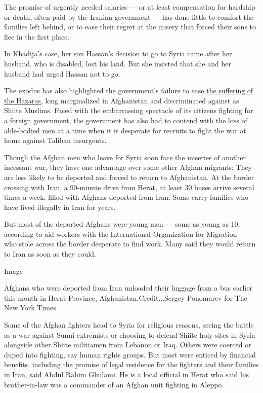 The promise of urgently needed salaries --- or at least compensation for
hardship or death, often paid by the Iranian government --- has done
little to comfort the families left behind, or to ease their regret at
the misery that forced their sons to flee in the first place.

In Khadija's case, her son Hassan's decision to go to Syria came after
her husband, who is disabled, lost his land. But she insisted that she
and her husband had urged Hassan not to go.

The exodus has also highlighted the government's failure to ease
\href{https://www.nytimes3xbfgragh.onion/2016/07/25/world/asia/hazara-afghanistan-victims.html}{the
suffering of the Hazaras}, long marginalized in Afghanistan and
discriminated against as Shiite Muslims. Faced with the embarrassing
spectacle of its citizens fighting for a foreign government, the
government has also had to contend with the loss of able-bodied men at a
time when it is desperate for recruits to fight the war at home against
Taliban insurgents.

Though the Afghan men who leave for Syria soon face the miseries of
another incessant war, they have one advantage over some other Afghan
migrants: They are less likely to be deported and forced to return to
Afghanistan. At the border crossing with Iran, a 90-minute drive from
Herat, at least 30 buses arrive several times a week, filled with
Afghans deported from Iran. Some carry families who have lived illegally
in Iran for years.

But most of the deported Afghans were young men --- some as young as 10,
according to aid workers with the International Organization for
Migration --- who stole across the border desperate to find work. Many
said they would return to Iran as soon as they could.

Image

Afghans who were deported from Iran unloaded their luggage from a bus
earlier this month in Herat Province, Afghanistan.Credit...Sergey
Ponomarev for The New York Times

Some of the Afghan fighters head to Syria for religious reasons, seeing
the battle as a war against Sunni extremists or choosing to defend
Shiite holy sites in Syria alongside other Shiite militiamen from
Lebanon or Iraq. Others were coerced or duped into fighting, say human
rights groups. But most were enticed by financial benefits, including
the promise of legal residence for the fighters and their families in
Iran, said Abdul Rahim Ghulami. He is a local official in Herat who said
his brother-in-law was a commander of an Afghan unit fighting in Aleppo.

